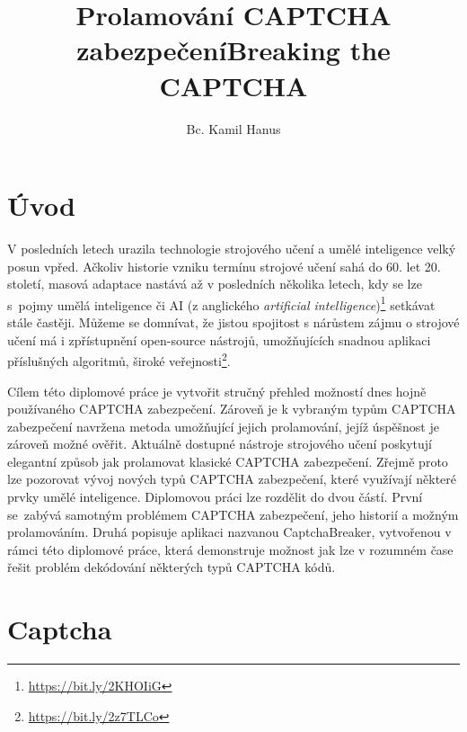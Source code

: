 \documentclass[
  field=ainfp,
  master=true,
  biblatex,
  sourcecodes=false,
  theorems=false,
  glossaries,
  index
]{kidiplom}
\title{Prolamování CAPTCHA zabezpečení}
\title[english]{Breaking the CAPTCHA}
\author{Bc. Kamil Hanus}
\begin{document}
\maketitle



\newcommand{\BibLaTeX}{\textsc{Bib}\LaTeX}
\renewcommand\UrlFont{}



\section{Úvod}
V posledních letech urazila technologie strojového učení a umělé inteligence velký posun vpřed. Ačkoliv historie vzniku termínu strojové učení sahá do  60. let 20. století, masová adaptace nastává až v posledních několika letech, kdy se lze s~pojmy umělá inteligence či AI (z anglického \textit{artificial intelligence})\footnote{\url{https://bit.ly/2KHOIiG}} setkávat stále častěji. Můžeme se domnívat, že jistou spojitost s nárůstem zájmu o strojové učení má i zpřístupnění open-source nástrojů, umožňujících snadnou aplikaci příslušných algoritmů, široké veřejnosti\footnote{\url{https://bit.ly/2z7TLCo}}.

Cílem této diplomové práce je vytvořit stručný přehled možností dnes hoj\-ně používaného CAPTCHA zabezpečení. Zároveň je k vybraným typům CAPTCHA zabezpečení navržena metoda umožňující jejich prolamování, jejíž úspěšnost je zároveň možné ověřit.  Aktuálně dostupné nástroje strojového učení poskytují elegantní způsob jak prolamovat klasické CAPTCHA zabezpečení. Zřejmě proto lze pozorovat vývoj nových typů CAPTCHA zabezpečení, které využívají ně\-kte\-ré prvky umělé inteligence. Diplomovou práci lze rozdělit do dvou částí. První se~zabývá samotným problémem CAPTCHA zabezpečení, jeho historií a možným prolamováním. Druhá popisuje aplikaci nazvanou CaptchaBreaker, vytvořenou v rámci této diplomové práce, která demonstruje možnost jak lze v rozumném čase řešit problém dekódování některých typů CAPTCHA kódů.
\newpage
\section{Captcha}
\end{document}
